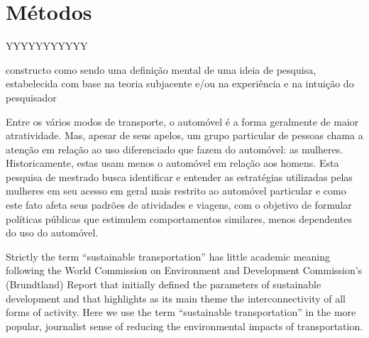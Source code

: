 \chapter{Métodos}\label{chap:metodo}

YYYYYYYYYYY

constructo como sendo uma definição mental de uma ideia de pesquisa, estabelecida com base na teoria subjacente e/ou na experiência e na intuição do pesquisador

Entre os vários modos de transporte, o automóvel é a forma geralmente de maior atratividade. Mas, apesar de seus apelos, um grupo particular de pessoas chama a atenção em relação ao uso diferenciado que fazem do automóvel: as mulheres. Historicamente, estas usam menos o automóvel em relação aos homens. Esta pesquisa de mestrado busca identificar e entender as estratégias utilizadas pelas mulheres em seu acesso em geral mais restrito ao automóvel particular e como este fato afeta seus padrões de atividades e viagens, com o objetivo de formular políticas públicas que estimulem comportamentos similares, menos dependentes  do uso do automóvel.


Strictly the term “sustainable transportation” has little academic meaning
following the World Commission on Environment and Development Commission’s
(Brundtland) Report that initially defined the parameters of sustainable
development and that highlights as its main theme the interconnectivity of
all forms of activity. Here we use the term “sustainable transportation” in
the more popular, journalist sense of reducing the environmental impacts of
transportation.